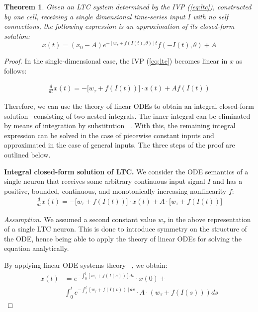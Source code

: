 \documentclass[12pt]{article}
\newtheorem{theorem}{Theorem}
\begin{document}
\begin{theorem}
\label{theo:ltc_closed_form}
Given an LTC system determined by the IVP (\ref{eq:ltc}), constructed by one cell, receiving a single dimensional time-series input $I$ with no self connections, the following expression is an approximation of its closed-form solution: \begin{equation}
\label{eq:approx_closed_form_solution_ltc}
    x(t) = (x_0 - A) e^{-[w_\tau + f(I(t),\theta)]t} f(-I(t),\theta) + A
\end{equation}
\end{theorem}

\begin{proof}
In the single-dimensional case, the IVP (\ref{eq:ltc}) becomes linear in $x$ as follows:

\begin{align}
\frac{d}{dt} x (t) = - \big[w_\tau + f(I(t))\big] \cdot x(t) + A f(I(t))
\end{align}

\noindent Therefore, we can use the theory of linear ODEs to obtain an integral closed-form solution~ \cite[Section 1.10]{PerkoODEs} consisting of two nested integrals. The inner integral can be eliminated by means of integration by substitution~ \cite{Rudin76}. With this, the remaining integral expression can be solved in the case of piecewise constant inputs and approximated in the case of general inputs. The three steps of the proof are outlined below.

\noindent \textbf{Integral closed-form solution of LTC.} We consider the ODE semantics of a single neuron that receives some arbitrary continuous input signal $I$ and has a positive, bounded, continuous, and monotonically increasing nonlinearity $f$:
\begin{align*}
\frac{d}{dt} x (t) = - \big[w_\tau + f(I(t))\big] \cdot x(t) + A \cdot \big[w_\tau + f(I(t))\big]
\end{align*}

\noindent \textit{Assumption.} We assumed a second constant value $w_\tau$ in the above representation of a single LTC neuron. This is done to introduce symmetry on the structure of the ODE, hence being able to apply the theory of linear ODEs for solving the equation analytically.

\noindent By applying linear ODE systems theory~ \cite[Section 1.10]{PerkoODEs}, we obtain:
\begin{align}\label{eq_sol_double_int}
x(t) &= e^{- \int_0^t[w_\tau + f(I(s))] ds} \cdot x(0) + \nonumber \\ 
& \int_0^t e^{ - \int_s^t [w_\tau + f(I(v))] dv } \cdot A \cdot (w_\tau + f(I(s))) ds 
\end{align}


\end{proof}
\end{document}
